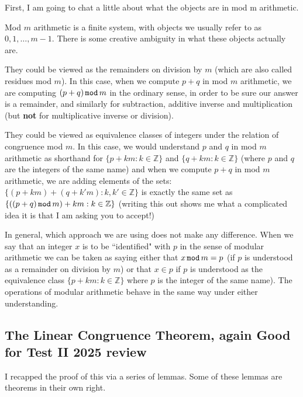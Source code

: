 \documentclass[12pt]{article}
\begin{document}
First, I am going to chat a little about what the objects are in mod m arithmetic.

Mod $m$ arithmetic is a finite system, with objects we usually refer to as $0,1,\ldots,m-1$.  There is some creative ambiguity in what these objects actually are.

They could be viewed as the remainders on division by $m$ (which are also called residues mod $m$).  In this case, when we compute
$p+q$ in mod $m$ arithmetic, we are computing $(p+q) \,{\tt mod}\, m$ in the ordinary sense, in order to be sure our answer is a remainder, and similarly for subtraction, additive inverse and multiplication (but {\bf not} for multiplicative inverse or division).

They could be viewed as equivalence classes of integers under the relation of congruence mod $m$.  In this case, we would understand $p$ and $q$ in mod $m$ arithmetic as shorthand for $\{p+km:k \in {\mathbb Z}\}$  and $\{q+km:k \in {\mathbb Z}\}$ (where $p$ and $q$ are the integers of the  same name)
and when we compute $p+q$ in mod $m$ arithmetic, we are adding elements of the sets:  $\{(p+km) + (q+k'm):k, k' \in {\mathbb Z}\}$ is exactly the same set
as $\{((p+q) \,{\tt mod}\,m)+km:k \in {\mathbb Z}\}$ (writing this out shows me what a complicated idea it is that I am asking you to accept!)

In general, which approach we are using does not make any difference.  When we say that an integer $x$ is to be ``identified" with $p$ in the sense of modular arithmetic
we can be taken as saying either that $x \,{\tt mod}\,m = p$ (if $p$ is understood as a remainder on division by $m$) or that $x \in p$ if $p$ is understood as the equivalence class $\{p+km:k \in {\mathbb Z}\}$ where $p$ is the integer of the same name).  The operations of modular arithmetic behave in the same way under either understanding.
\newpage
\subsection{The Linear Congruence Theorem, again   Good for Test II 2025 review}

I recapped the proof of this via a series of lemmas.  Some of these lemmas are theorems in their own right.
\end{document}
